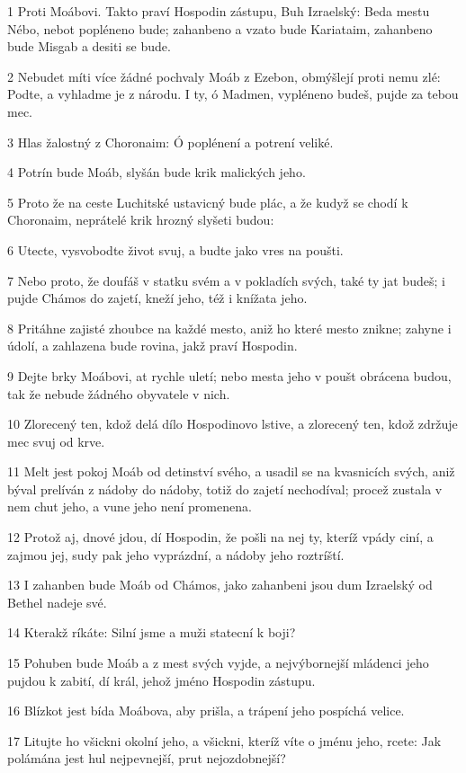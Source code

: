 \par 1 Proti Moábovi. Takto praví Hospodin zástupu, Buh Izraelský: Beda mestu Nébo, nebot popléneno bude; zahanbeno a vzato bude Kariataim, zahanbeno bude Misgab a desiti se bude.
\par 2 Nebudet míti více žádné pochvaly Moáb z Ezebon, obmýšlejí proti nemu zlé: Podte, a vyhladme je z národu. I ty, ó Madmen, vypléneno budeš, pujde za tebou mec.
\par 3 Hlas žalostný z Choronaim: Ó poplénení a potrení veliké.
\par 4 Potrín bude Moáb, slyšán bude krik malických jeho.
\par 5 Proto že na ceste Luchitské ustavicný bude plác, a že kudyž se chodí k Choronaim, neprátelé krik hrozný slyšeti budou:
\par 6 Utecte, vysvobodte život svuj, a budte jako vres na poušti.
\par 7 Nebo proto, že doufáš v statku svém a v pokladích svých, také ty jat budeš; i pujde Chámos do zajetí, kneží jeho, též i knížata jeho.
\par 8 Pritáhne zajisté zhoubce na každé mesto, aniž ho které mesto znikne; zahyne i údolí, a zahlazena bude rovina, jakž praví Hospodin.
\par 9 Dejte brky Moábovi, at rychle uletí; nebo mesta jeho v poušt obrácena budou, tak že nebude žádného obyvatele v nich.
\par 10 Zlorecený ten, kdož delá dílo Hospodinovo lstive, a zlorecený ten, kdož zdržuje mec svuj od krve.
\par 11 Melt jest pokoj Moáb od detinství svého, a usadil se na kvasnicích svých, aniž býval prelíván z nádoby do nádoby, totiž do zajetí nechodíval; procež zustala v nem chut jeho, a vune jeho není promenena.
\par 12 Protož aj, dnové jdou, dí Hospodin, že pošli na nej ty, kteríž vpády ciní, a zajmou jej, sudy pak jeho vyprázdní, a nádoby jeho roztríští.
\par 13 I zahanben bude Moáb od Chámos, jako zahanbeni jsou dum Izraelský od Bethel nadeje své.
\par 14 Kterakž ríkáte: Silní jsme a muži statecní k boji?
\par 15 Pohuben bude Moáb a z mest svých vyjde, a nejvýbornejší mládenci jeho pujdou k zabití, dí král, jehož jméno Hospodin zástupu.
\par 16 Blízkot jest bída Moábova, aby prišla, a trápení jeho pospíchá velice.
\par 17 Litujte ho všickni okolní jeho, a všickni, kteríž víte o jménu jeho, rcete: Jak polámána jest hul nejpevnejší, prut nejozdobnejší?
